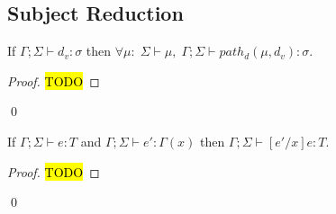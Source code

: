 \documentclass{llncs}
\begin{document}
\subsection{Subject Reduction}

\begin{lemma} \label{lem:path_type_preservation}
If $\Gamma; \Sigma \vdash d_v : \sigma$ then 
$\forall \mu: \; \Sigma \vdash  \mu, \; 
\Gamma; \Sigma \vdash path_d(\mu,d_v): \sigma$.
\end{lemma}
\begin{proof}
\hl{TODO}
\end{proof}
\qed

\begin{lemma} \label{lem:subst}
If $\Gamma; \Sigma \vdash e : T$ and 
$\Gamma; \Sigma \vdash e': \Gamma(x)$ then 
$\Gamma; \Sigma \vdash [e'/x]e: T$.
\end{lemma}
\begin{proof}
\hl{TODO}
\end{proof}
\qed
\end{document}
